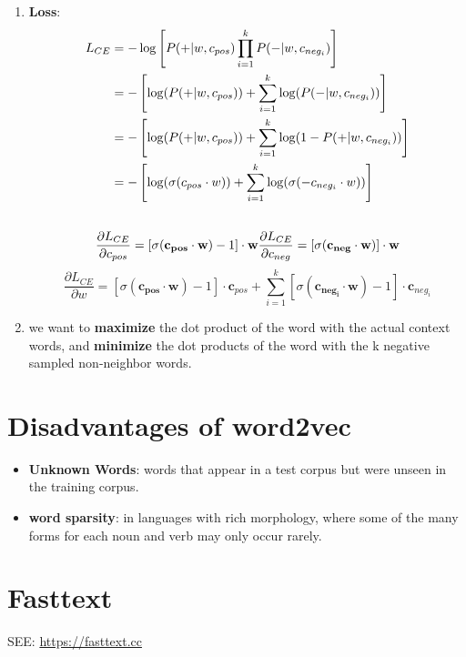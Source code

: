 \begin{enumerate}
    \item \textbf{Loss}:
    \begin{align}
        L_{CE} \notag
        &= -\log\left[ P(+|w, c_{pos}) \prod_{i=1}^{k} P(-|w, c_{neg_i}) \right]\\ \notag
        &= -\left[ \log(P(+|w, c_{pos})) + \sum_{i=1}^{k} \log(P(-|w, c_{neg_i})) \right]\\ \notag
        &= -\left[ \log(P(+|w, c_{pos})) + \sum_{i=1}^{k} \log(1-P(+|w, c_{neg_i})) \right]\\ \notag
        &= -\left[ \log(\sigma(c_{pos}\cdot w)) + \sum_{i=1}^{k} \log(\sigma(-c_{neg_i}\cdot w)) \right]\\ \notag
    \end{align}
    \[
        \displaystyle \frac{\partial L_{CE}}{\partial c_{pos}} = [\sigma(\mathbf{c_{pos}\cdot w})-1]\cdot \mathbf{w} \hfill \displaystyle \frac{\partial L_{CE}}{\partial c_{neg}} = [\sigma(\mathbf{c_{neg}\cdot w})]\cdot \mathbf{w}
    \]
    \[
        \displaystyle \frac{\partial L_{CE}}{\partial w} = [\sigma(\mathbf{c_{pos}\cdot w})-1]\cdot \mathbf{c}_{pos} + \sum_{i=1}^{k}[\sigma(\mathbf{c_{neg_i}\cdot w})-1]\cdot \mathbf{c}_{neg_i}
    \]


    \item we want to \textbf{maximize} the dot product of the word with the actual context words, and \textbf{minimize} the dot products of the word with the k negative sampled non-neighbor words.

    
    
\end{enumerate}

\section*{Disadvantages of word2vec \cite{nlp-1}}
\begin{itemize}
    \item \textbf{Unknown Words}: words that appear in a test corpus but were unseen in the training corpus.

    \item \textbf{word sparsity}: in languages with rich morphology, where some of the many forms for each noun and verb may only occur rarely.
\end{itemize}

\section{Fasttext \cite{nlp-1}}\label{Fasttext}
SEE: \url{https://fasttext.cc}

